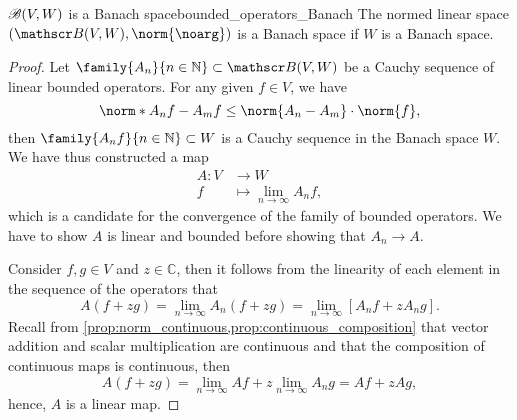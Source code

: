 \begin{theorem}{\(\mathscr{B}(V, W)\) is a Banach space}{bounded_operators_Banach}
    The normed linear space \((\bounded(V, W), \norm{\noarg})\) is a Banach space if \(W\) is a Banach space.
\end{theorem}
\begin{proof}
    Let \(\family{A_n}{n \in \mathbb{N}} \subset \bounded(V, W)\) be a Cauchy sequence of linear bounded operators. For any given \(f \in V\), we have
    \begin{equation*}
        \norm*{A_nf - A_mf} \leq \norm{A_n - A_m}\cdot\norm{f},
    \end{equation*}
    then \(\family{A_nf}{n\in \mathbb{N}} \subset W\) is a Cauchy sequence in the Banach space \(W\). We have thus constructed a map
    \begin{align*}
        A : V &\to W\\
        f &\mapsto \lim_{n\to \infty} A_n f,
    \end{align*}
    which is a candidate for the convergence of the family of bounded operators. We have to show \(A\) is linear and bounded before showing that \(A_n \to A\).

    Consider \(f, g \in V\) and \(z \in \mathbb{C}\), then it follows from the linearity of each element in the sequence of the operators that
    \begin{equation*}
        A(f + zg) = \lim_{n\to\infty} A_n(f + zg) = \lim_{n\to \infty} \left[A_nf + z A_n g\right].
    \end{equation*}
    Recall from \cref{prop:norm_continuous,prop:continuous_composition} that vector addition and scalar multiplication are continuous and that the composition of continuous maps is continuous, then
    \begin{equation*}
        A(f + zg) = \lim_{n \to \infty} Af + z \lim_{n\to \infty}A_ng = Af + z Ag,
    \end{equation*}
    hence, \(A\) is a linear map.


\end{proof}
